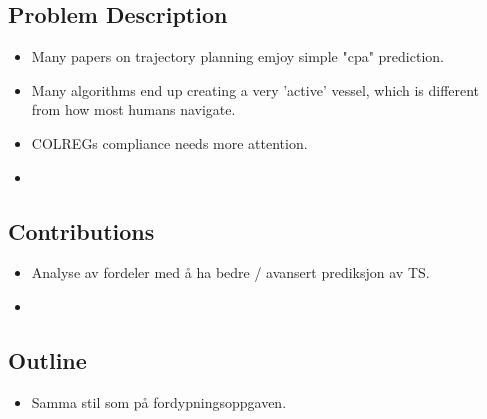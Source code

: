 \subsection{Problem Description}
\begin{itemize}
    \item Many papers on trajectory planning emjoy simple "cpa" prediction.
    \item Many algorithms end up creating a very 'active' vessel, which is different from how most humans navigate.
    \item \gls{COLREGs} compliance needs more attention.
    \item 
\end{itemize}

\subsection{Contributions}
\begin{itemize}
    \item Analyse av fordeler med å ha bedre / avansert prediksjon av TS.
    \item 
\end{itemize}

\subsection{Outline}
\begin{itemize}
    \item Samma stil som på fordypningsoppgaven.
\end{itemize}


\newpage